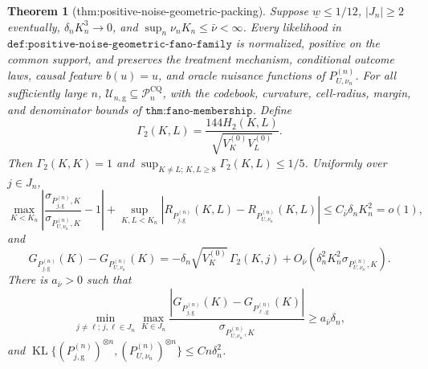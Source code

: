 \documentclass{article}
\newtheorem{theorem}{Theorem}
\begin{document}
\begin{theorem}[thm:positive-noise-geometric-packing]\label{thm:positive-noise-geometric-packing}
Suppose \(\underline w\leq1/12\), \(|J_n|\geq2\) eventually, \(\delta_nK_n^3\to0\), and \(\sup_n\nu_nK_n\leq\bar\nu<\infty\).  Every likelihood in \(\texttt{def:positive-noise-geometric-fano-family}\) is normalized, positive on the common support, and preserves the treatment mechanism, conditional outcome laws, causal feature \(b(u)=u\), and oracle nuisance functions of \(P_{U,\nu_n}^{(n)}\).  For all sufficiently large \(n\), \(\mathcal U_{n,\mathrm g}\subseteq\mathcal P_n^{\mathrm{CQ}}\), with the codebook, curvature, cell-radius, margin, and denominator bounds of \(\texttt{thm:fano-membership}\).  Define
\[
 \Gamma_2(K,L)=\frac{144H_2(K,L)}{\sqrt{V_K^{(0)}V_L^{(0)}}}.
\]
Then \(\Gamma_2(K,K)=1\) and \(\sup_{K\ne L;\,K,L\geq8}\Gamma_2(K,L)\leq1/5\).  Uniformly over \(j\in J_n\),
\[
 \max_{K<K_n}\left|\frac{\sigma_{P_{j,\mathrm g}^{(n)},K}}
 {\sigma_{P_{U,\nu_n}^{(n)},K}}-1\right|
 +\sup_{K,L<K_n}\left|R_{P_{j,\mathrm g}^{(n)}}(K,L)
 -R_{P_{U,\nu_n}^{(n)}}(K,L)\right|
 \leq C_{\bar\nu}\delta_nK_n^2=o(1),
\]
and
\[
 G_{P_{j,\mathrm g}^{(n)}}(K)-G_{P_{U,\nu_n}^{(n)}}(K)
 =-\delta_n\sqrt{V_K^{(0)}}\,\Gamma_2(K,j)
 +O_{\bar\nu}\!\left(\delta_n^2K_n^2\sigma_{P_{U,\nu_n}^{(n)},K}\right).
\]
There is \(a_{\bar\nu}>0\) such that
\[
 \min_{j\ne\ell;\,j,\ell\in J_n}\max_{K\in J_n}
 \frac{|G_{P_{j,\mathrm g}^{(n)}}(K)-G_{P_{\ell,\mathrm g}^{(n)}}(K)|}
 {\sigma_{P_{U,\nu_n}^{(n)},K}}
 \geq a_{\bar\nu}\delta_n,
\]
and \(\operatorname{KL}\{(P_{j,\mathrm g}^{(n)})^{\otimes n},(P_{U,\nu_n}^{(n)})^{\otimes n}\}\leq Cn\delta_n^2\).
\end{theorem}
\end{document}
